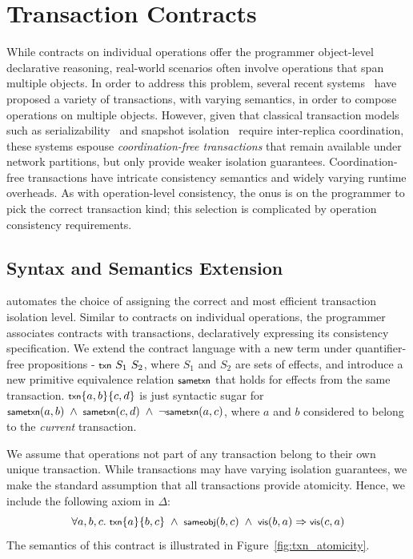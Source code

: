 \section{Transaction Contracts}

While contracts on individual operations offer the programmer object-level
declarative reasoning, real-world scenarios often involve operations that
span multiple objects. In order to address this problem, several recent
systems~\cite{COPS,BurckhardtESOP,BailisHAT} have proposed a variety of
transactions, with varying semantics, in order to compose operations on
multiple objects. However, given that classical transaction models such as
serializability~\cite{} and snapshot isolation~\cite{} require inter-replica
coordination, these systems espouse \emph{coordination-free transactions}
that remain available under network partitions, but only provide weaker
isolation guarantees. Coordination-free transactions have intricate
consistency semantics and widely varying runtime overheads. As with
operation-level consistency, the onus is on the programmer to pick the
correct transaction kind; this selection is complicated by operation
consistency requirements.

\subsection{Syntax and Semantics Extension}
\label{sec:syn_sem_ext}

\name automates the choice of assigning the correct and most efficient
transaction isolation level. Similar to contracts on individual operations, the
programmer associates contracts with transactions, declaratively expressing its
consistency specification. We extend the contract language with a new term
under quantifier-free propositions - ${\small \txnZ}~S_1~S_2$, where $S_1$ and
$S_2$ are sets of effects, and introduce a new primitive equivalence relation
$\small \sametxnZ$ that holds for effects from the same transaction. $\small
\txn{a,b}{c,d}$ is just syntactic sugar for $\small \sametxn{a}{b} ~\wedge~
\sametxn{c}{d} ~\wedge~ \neg\sametxn{a}{c}$, where $a$ and $b$ considered to
belong to the \emph{current} transaction.

We assume that operations not part of any transaction belong to their own
unique transaction. While transactions may have varying isolation
guarantees, we make the standard assumption that all transactions provide
atomicity. Hence, we include the following axiom in $\Delta$: \[\small \forall
a,b,c.~\txn{a}{b,c} ~\wedge~ \sameobj{b}{c} ~\wedge~ \vis{b}{a} \Rightarrow
\vis{c}{a}\] \noindent The semantics of this contract is illustrated in
Figure~\ref{fig:txn_atomicity}.

